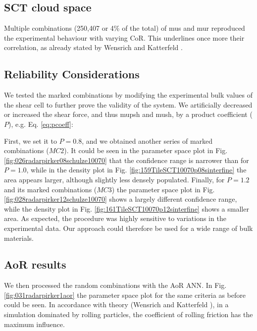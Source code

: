 \subsection{SCT cloud space}
\label{subsec:sctcloudspace}

Multiple
combinations (250,407 or 4\% of the total) of \acs{mus} and \acs{mur} reproduced
the experimental behaviour with varying \acs{CoR}.
This underlines once more their correlation, as already stated by Wensrich and 
Katterfeld \cite{RefWorks:87}.



\subsection{Reliability Considerations}
\label{subsec:reliabilityconsiderations}

We tested the marked combinations
by modifying the experimental bulk values of the shear cell to further prove
the validity of the system.
We artificially decreased or increased the shear force, and thus \acs{mupsh} and
\acs{mush}, by a product coefficient ($P$), e.g. Eq. \ref{eq:pcoeff}:

First, we set it to $P=0.8$, and we obtained another
series of marked combinations ($MC2$).
It could be seen in the parameter space plot in Fig.
\ref{fig:026radarpirker08schulze10070} that the confidence range is narrower
than for $P=1.0$, while in the density plot in Fig. 
\ref{fig:159TileSCT10070p08sinterfine} the area
appears larger, although slightly less densely populated. Finally, for $P=1.2$
and its marked combinations ($MC3$) the parameter space plot in Fig.
\ref{fig:028radarpirker12schulze10070} shows a largely different confidence
range, while the density plot in Fig. \ref{fig:161TileSCT10070p12sinterfine} 
shows a smaller area. As expected, the procedure was highly sensitive to
variations in the experimental data.
Our approach could therefore be used
for a wide range of bulk materials.\\

\subsection{AoR results}
\label{subsec:aorresults}

We then processed the random combinations with the \acs{AoR} \acs{ANN}. In Fig.
\ref{fig:031radarpirker1aor} the parameter space plot for the same criteria as
before could be seen.
In accordance with theory (Wensrich and Katterfeld \cite{RefWorks:87}), in a simulation dominated
by rolling particles, the coefficient of rolling friction has the maximum
influence. \\

% 

